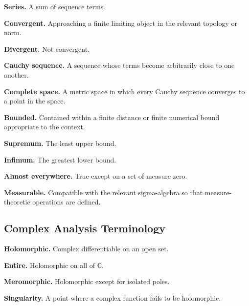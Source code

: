 \medskip

\textbf{Series.}
A sum of sequence terms.

\medskip

\textbf{Convergent.}
Approaching a finite limiting object in the relevant topology or norm.

\medskip

\textbf{Divergent.}
Not convergent.

\medskip

\textbf{Cauchy sequence.}
A sequence whose terms become arbitrarily close to one another.

\medskip

\textbf{Complete space.}
A metric space in which every Cauchy sequence converges to a point in the
space.

\medskip

\textbf{Bounded.}
Contained within a finite distance or finite numerical bound appropriate to
the context.

\medskip

\textbf{Supremum.}
The least upper bound.

\medskip

\textbf{Infimum.}
The greatest lower bound.

\medskip

\textbf{Almost everywhere.}
True except on a set of measure zero.

\medskip

\textbf{Measurable.}
Compatible with the relevant sigma-algebra so that measure-theoretic
operations are defined.

\subsection{Complex Analysis Terminology}
\label{subsec:complex-analysis-terminology}

\textbf{Holomorphic.}
Complex differentiable on an open set.

\medskip

\textbf{Entire.}
Holomorphic on all of \(\mathbb{C}\).

\medskip

\textbf{Meromorphic.}
Holomorphic except for isolated poles.

\medskip

\textbf{Singularity.}
A point where a complex function fails to be holomorphic.

